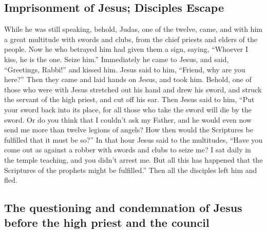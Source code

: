 \hypertarget{imprisonment-of-jesus-disciples-escape}{%
\subsection{Imprisonment of Jesus; Disciples
Escape}\label{imprisonment-of-jesus-disciples-escape}}

 While he was still speaking, behold, Judas, one of the
twelve, came, and with him a great multitude with swords and clubs, from
the chief priests and elders of the people.  Now he who
betrayed him had given them a sign, saying, ``Whoever I kiss, he is the
one. Seize him.''  Immediately he came to Jesus, and
said, ``Greetings, Rabbi!'' and kissed him.  Jesus said
to him, ``Friend, why are you here?'' Then they came and laid hands on
Jesus, and took him.  Behold, one of those who were with
Jesus stretched out his hand and drew his sword, and struck the servant
of the high priest, and cut off his ear.  Then Jesus said
to him, ``Put your sword back into its place, for all those who take the
sword will die by the sword.  Or do you think that I
couldn't ask my Father, and he would even now send me more than twelve
legions of angels?  How then would the Scriptures be
fulfilled that it must be so?''  In that hour Jesus said
to the multitudes, ``Have you come out as against a robber with swords
and clubs to seize me? I sat daily in the temple teaching, and you
didn't arrest me.  But all this has happened that the
Scriptures of the prophets might be fulfilled.'' Then all the disciples
left him and fled.

\hypertarget{the-questioning-and-condemnation-of-jesus-before-the-high-priest-and-the-council}{%
\subsection{The questioning and condemnation of Jesus before the high
priest and the
council}\label{the-questioning-and-condemnation-of-jesus-before-the-high-priest-and-the-council}}

